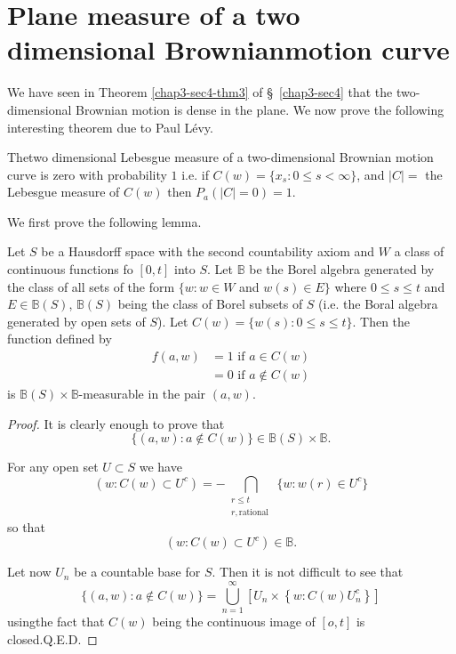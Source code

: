\section[Plane measure of a two dimensional...]{Plane measure of a two dimensional Brownian\hfil\break motion
  curve}\label{chap3-sec8}%

We have seen in Theorem \ref{chap3-sec4-thm3} of \S\ \ref{chap3-sec4} that the two-dimensional
Brownian motion is dense in the plane. We now prove the following
interesting theorem due to Paul L\'evy. 
\setcounter{thm}{0}
\begin{thm}[P.~Levy]\label{chap3-sec8-thm1} %
  The\pageoriginale two dimensional Lebesgue measure of a
  two-dimensional Brownian 
  motion curve is zero with probability $1$ i.e. if $C(w)=\{ x_s:0
  \leq s < \infty \}$, and $|C|=$ the Lebesgue measure of $C(w)$ then
  $P_a(|C|=0)=1$. 
\end{thm}

We first prove the following lemma.
\begin{lemma*}
  Let $S$ be a Hausdorff space with the second countability axiom and
  $W$ a class of continuous functions fo $[0,t]$ into $S$. Let
  $\mathbb{B}$ be the Borel algebra generated by the class of all sets
  of the form $\{ w : w \in W$ and $w(s)\in E \}$ where $0 \leq s \leq
  t$ and $E \in \mathbb{B}(S)$, $\mathbb{B}(S)$ being the class of Borel
  subsets of $S$ (i.e. the Boral algebra generated by open sets of
  $S$). Let $C(w)=\{ w(s): 0 \leq s \leq t \}$. Then the function
  defined by 
  \begin{align*}
    f(a,w) &=1 \text{ if } a \in C(w)\\
    &= 0 \text{ if }a \notin C(w)
  \end{align*}
is $\mathbb{B} (S) \times \mathbb{B}$-measurable in the pair $(a,w)$.
\end{lemma*}

\begin{proof}
It is clearly enough to prove that
  $$
  \{ (a,w):a \notin C(w) \} \in \mathbb{B} (S)\times \mathbb{B}.
  $$

For any open set $U \subset S$ we have
  $$
  (w:C(w)\subset U^c)=-\bigcap _{\substack {r \leq t\\{r, \text{
          rational }}}} \{ w:w(r)\in U^c \} 
  $$
  so that
  $$
  (w: C(w)\subset U^c)\in \mathbb{B}.
  $$

  Let now $U_n$ be a countable base for $S$. Then it is not difficult
  to see that 
  $$
  \{ (a,w):a \notin C(w) \} = \bigcup^\infty_ {n=1} \left[U_n \times \left\{ w:
    C(w)U^c_n \right\} \right] 
  $$
  using\pageoriginale the fact that $C(w)$ being the continuous image
  of $[o,t]$ is 
  closed.\hfill Q.E.D. 
\end{proof}

